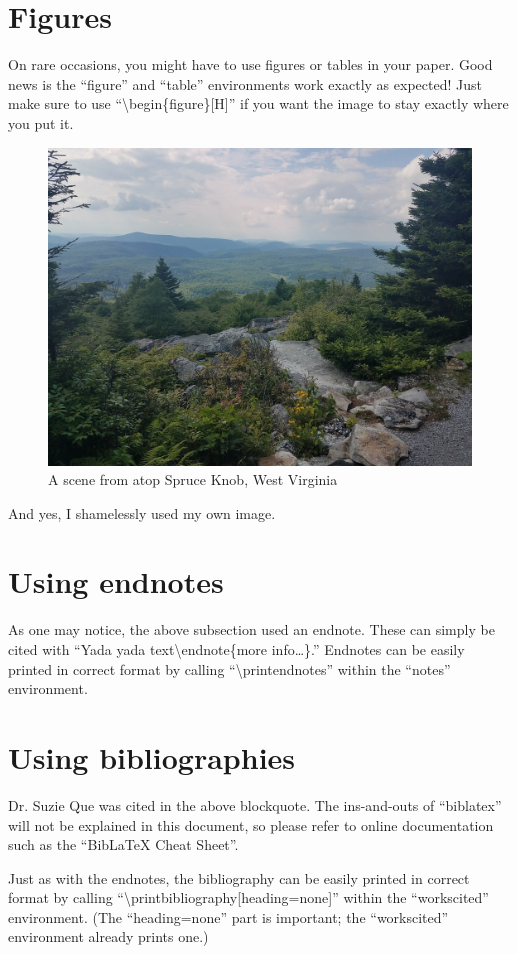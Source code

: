 \documentclass[mla8]{mla}
\begin{document}
\begin{paper}
\section{Figures}

On rare occasions, you might have to use figures or tables
in your paper.
Good news is the ``figure'' and ``table'' environments
work exactly as expected!
Just make sure to use ``\textbackslash{}begin\{figure\}[H]''
if you want the image to stay exactly where you put it.
\begin{figure}[H]
\includegraphics[width=0.5\linewidth]{mla-example-image}
\caption{A scene from atop Spruce Knob, West Virginia}
\end{figure}
And yes, I shamelessly used my own image.

\section{Using endnotes}

As one may notice, the above subsection used an endnote.
These can simply be cited with
``Yada yada text\textbackslash{}endnote\{more info\ldots\}.''
Endnotes can be easily printed in correct format by calling
``\textbackslash{}printendnotes'' within the
``notes'' environment.

\section{Using bibliographies}

Dr. Suzie Que was cited in the above blockquote.
The ins-and-outs of ``biblatex'' will not be explained in this
document, so please refer to online documentation such as the
``BibLaTeX Cheat Sheet''.

Just as with the endnotes,
the bibliography can be easily printed in correct format by calling
``\textbackslash{}printbibliography[heading=none]'' within the
``workscited'' environment.
(The ``heading=none'' part is important; the ``workscited'' environment
already prints one.)

\end{paper}

\begin{notes}

\printendnotes

\end{notes}

\begin{workscited}

\printbibliography[heading=none]

\end{workscited}
\end{document}
